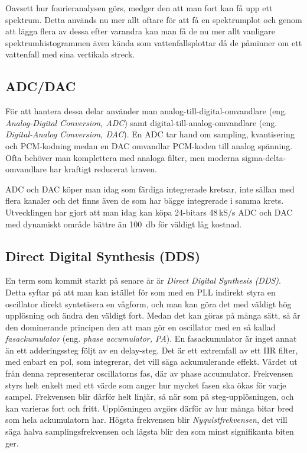 Oavsett hur fourieranalysen görs, medger den att man fort kan få upp ett
spektrum.
Detta används nu mer allt oftare för att få en spektrumplot och genom att
lägga flera av dessa efter varandra kan man få de nu mer allt vanligare
spektrumhistogrammen även kända som vattenfallsplottar då de påminner om ett
vattenfall med sina vertikala streck.

\subsection{ADC/DAC}
\label{ADC-DAC}

För att hantera dessa delar använder man analog-till-digital-omvandlare
(eng. \emph{Analog-Digital Conversion, ADC}) samt digital-till-analog-omvandlare 
(eng. \emph{Digital-Analog Conversion, DAC}).
En ADC tar hand om sampling, kvantisering och PCM-kodning medan en DAC
omvandlar PCM-koden till analog spänning.
Ofta behöver man komplettera med analoga filter, men moderna sigma-delta-omvandlare 
har kraftigt reducerat kraven.

ADC och DAC köper man idag som färdiga integrerade kretsar, inte sällan med
flera kanaler och det finns även de som har bägge integrerade i samma krets.
Utvecklingen har gjort att man idag kan köpa 24-bitars 48\,kS/s ADC och DAC med
dynamiskt område bättre än \qty{100}{\decibel} för väldigt låg kostnad.


\subsection{Direct Digital Synthesis (DDS)}

En term som kommit starkt på senare år är \emph{Direct Digital Synthesis (DDS)}.
Detta syftar på att man kan istället för som med en PLL indirekt styra en
oscillator direkt syntetisera en vågform, och man kan göra det med väldigt
hög upplösning och ändra den väldigt fort.
Medan det kan göras på många sätt, så är den dominerande principen den att
man gör en oscillator med en så kallad \emph{fasackumulator} (eng. \emph{phase
accumulator, PA}).
En fasackumulator är inget annat än ett adderingssteg följt av en delay-steg.
Det är ett extremfall av ett IIR filter, med enbart en pol, som integrerar,
det vill säga ackumulerande effekt.
Värdet ut från denna representerar oscillatorns fas, där av phase accumulator.
Frekvensen styrs helt enkelt med ett värde som anger hur mycket fasen ska
ökas för varje sampel.
Frekvensen blir därför helt linjär, så när som på steg-upplösningen, och kan
varieras fort och fritt.
Upplösningen avgörs därför av hur många bitar bred som hela ackumulatorn har.
Högsta frekvensen blir \emph{Nyquistfrekvensen}, det vill säga halva
samplingsfrekvensen och lägsta blir den som minst signifikanta biten ger.

